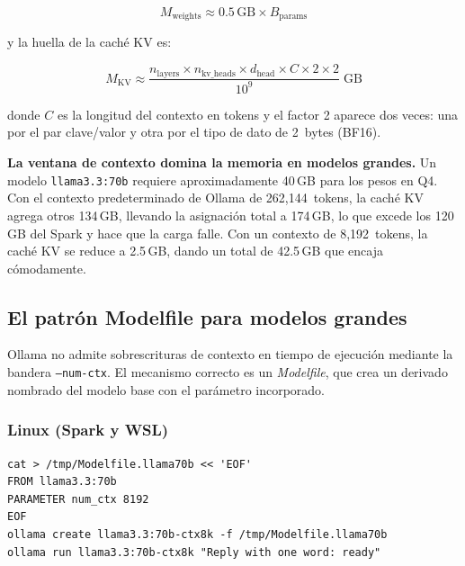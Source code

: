 \begin{equation}
M_{\text{weights}} \approx 0.5\,\text{GB} \times B_{\text{params}}
\label{eq:weights}
\end{equation}

\noindent y la huella de la caché KV es:

\begin{equation}
M_{\text{KV}} \approx \frac{n_{\text{layers}} \times n_{\text{kv\_heads}}
  \times d_{\text{head}} \times C \times 2 \times 2}{10^9}\;\text{GB}
\label{eq:kvcache}
\end{equation}

\noindent donde $C$ es la longitud del contexto en tokens y el factor 2
aparece dos veces: una por el par clave/valor y otra por el tipo de dato
de 2~bytes (BF16).

\begin{warningbox}
\textbf{La ventana de contexto domina la memoria en modelos grandes.} Un
modelo \texttt{llama3.3:70b} requiere aproximadamente 40\,GB para los
pesos en Q4. Con el contexto predeterminado de Ollama de 262{,}144~tokens,
la caché KV agrega otros 134\,GB, llevando la asignación total a 174\,GB,
lo que excede los 120\,GB del Spark y hace que la carga falle. Con un
contexto de 8{,}192~tokens, la caché KV se reduce a 2.5\,GB, dando un
total de 42.5\,GB que encaja cómodamente.
\end{warningbox}

\subsection{El patrón Modelfile para modelos grandes}

Ollama no admite sobrescrituras de contexto en tiempo de ejecución
mediante la bandera \texttt{--num-ctx}. El mecanismo correcto es un
\emph{Modelfile}, que crea un derivado nombrado del modelo base con el
parámetro incorporado.

\subsubsection{Linux (Spark y WSL)}

\begin{lstlisting}[style=bashstyle, caption={Crear una variante de modelo con contexto acotado en Linux}]
cat > /tmp/Modelfile.llama70b << 'EOF'
FROM llama3.3:70b
PARAMETER num_ctx 8192
EOF
ollama create llama3.3:70b-ctx8k -f /tmp/Modelfile.llama70b
ollama run llama3.3:70b-ctx8k "Reply with one word: ready"
\end{lstlisting}

